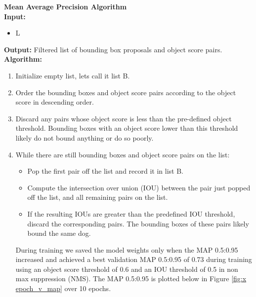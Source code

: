 \documentclass{article}
\begin{document}
\begin{minipage}{1\textwidth}%
	\noindent \textbf{Mean Average Precision Algorithm} \\

  \noindent \textbf{Input:} 
  	\begin{itemize}
  		\item L
  	\end{itemize}
  
  \noindent \textbf{Output:} Filtered list of bounding box proposals and object score pairs. \\
  
  \noindent \textbf{Algorithm:} \\
\end{minipage}%

\begin{enumerate}

  \item Initialize empty list, lets call it list B.

  \item Order the bounding boxes and object score pairs according to the object score in descending order.
  
  \item Discard any pairs whose object score is less than the pre-defined object threshold.  Bounding boxes with an object score lower than this threshold likely do not bound anything or do so poorly.
  
  \item While there are still bounding boxes and object score pairs on the list:
        \begin{itemize}
             \item Pop the first pair off the list and record it in list B.            
             \item Compute the intersection over union (IOU) between the pair just popped off the list, and all remaining pairs on the list.
             \item If the resulting IOUs are greater than the predefined IOU threshold, discard the corresponding pairs.  The bounding boxes of these pairs likely bound the same dog.
        \end{itemize}



During training we saved the model weights only when the MAP 0.5:0.95 increased and achieved a best validation MAP 0.5:0.95 of 0.73 during training using an object score threshold of 0.6 and an IOU threshold of 0.5 in non max suppression (NMS).  The MAP 0.5:0.95 is plotted below in Figure \ref{fig:x epoch_v_map} over 10 epochs. 


\end{enumerate}
\end{document}
